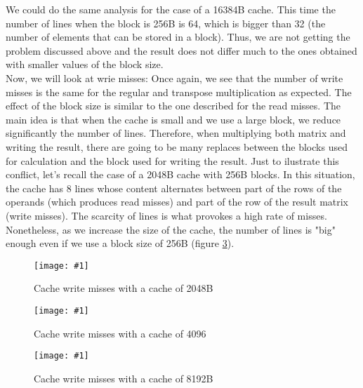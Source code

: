 \documentclass{article}
\newcommand{\myFigure}[4]{%
    \begin{figure}[!ht]
        \texttt{[image: \#1]}
        \centering
        \caption{#2}
        \label{#3}
    \end{figure}
}
\begin{document}
We could do the same analysis for the case of a 16384B cache. This time the number of lines when the block is 256B is 64, which is bigger than 32 (the number of elements that can be stored in a block). Thus, we are not getting the problem discussed above and the result does not differ much to the ones obtained with smaller values of the block size. \\


Now, we will look at wrie misses:
Once again, we see that the number of write misses is the same for the regular and transpose multiplication as expected. The effect of the block size is similar to the one described for the read misses. The main idea is that when the cache is small and we use a large block, we reduce significantly the number of lines. Therefore, when multiplying both matrix and writing the result, there are going to be many replaces between the blocks used for calculation and the block used for writing the result. Just to ilustrate this conflict, let's recall the case of a 2048B cache with 256B blocks. In this situation, the cache has 8 lines whose content alternates between part of the rows of the operands (which produces read misses) and part of the row of the result matrix (write misses). The scarcity of lines is what provokes a high rate of misses. Nonetheless, as we increase the size of the cache, the number of lines is "big" enough even if we use a block size of 256B (figure \ref{block_8192B_esc}). 


\myFigure{../material_P3/protect_out4/BlockSize_2048/cache_escritura.png}{Cache write misses with a cache of 2048B}{block_2048_esc}{0.55}


\myFigure{../material_P3/protect_out4/BlockSize_4096/cache_escritura.png}{Cache write misses with a cache of 4096}{block_4096_esc}{0.55}

\myFigure{../material_P3/protect_out4/BlockSize_8192/cache_escritura.png}{Cache write misses with a cache of 8192B}{block_8192B_esc}{0.55}

\end{document}

